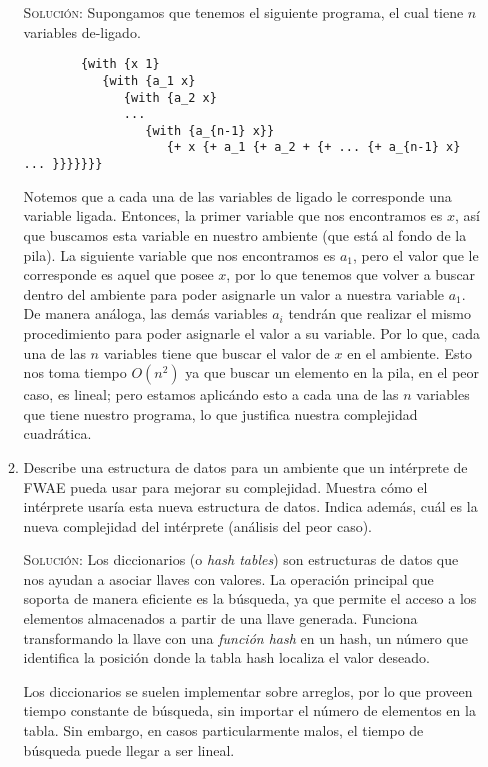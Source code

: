 \documentclass[letterpaper,11pt]{article}
\begin{document}
\begin{enumerate}
\begin{enumerate}
        \textsc{Solución:} Supongamos que tenemos el siguiente programa, el 
        cual tiene $n$ variables de-ligado.
        \begin{verbatim}
        {with {x 1} 
           {with {a_1 x} 
              {with {a_2 x} 
              ...
                 {with {a_{n-1} x}} 
                    {+ x {+ a_1 {+ a_2 + {+ ... {+ a_{n-1} x} ... }}}}}}}
        \end{verbatim}

        Notemos que a cada una de las variables de ligado le corresponde una 
        variable ligada. Entonces, la primer variable que nos encontramos es
        $x$, así que buscamos esta variable en nuestro ambiente (que está al 
        fondo de la pila). La siguiente variable que nos encontramos es 
        \texttt{$a_1$}, pero el valor que le corresponde es aquel que posee 
        $x$, por lo que tenemos que volver a buscar dentro del ambiente 
        para poder asignarle un valor a nuestra variable \texttt{$a_1$}. 
        De manera análoga, las demás variables $a_i$ tendrán que realizar el 
        mismo procedimiento para poder asignarle el valor a su variable. 
        Por lo que, cada una de las $n$ variables tiene que buscar el valor 
        de $x$ en el ambiente. Esto nos toma tiempo $O(n^2)$ ya que buscar 
        un elemento en la pila, en el peor caso, es lineal; pero estamos 
        aplicándo esto a cada una de las $n$ variables que tiene nuestro 
        programa, lo que justifica nuestra complejidad cuadrática. 

        \item Describe una estructura de datos para un ambiente que un 
        intérprete de FWAE pueda usar para mejorar su complejidad. Muestra 
        cómo el intérprete usaría esta nueva estructura de datos. Indica 
        además, cuál es la nueva complejidad del intérprete (análisis del 
        peor caso).

        \textsc{Solución:} Los diccionarios (o \textit{hash tables}) son 
        estructuras de datos que nos ayudan a asociar llaves con valores. 
        La operación principal que soporta de manera eficiente es la 
        búsqueda, ya que permite el acceso a los elementos almacenados a partir 
        de una llave generada. Funciona transformando la llave con una 
        \textit{función hash} en un hash, un número que identifica la posición 
        donde la tabla hash localiza el valor deseado. 

        Los diccionarios se suelen implementar sobre arreglos, por lo que proveen
        tiempo constante de búsqueda, sin importar el número de elementos en la
        tabla. Sin embargo, en casos particularmente malos, el tiempo de búsqueda 
        puede llegar a ser lineal.


\end{enumerate}
\end{enumerate}
\end{document}
